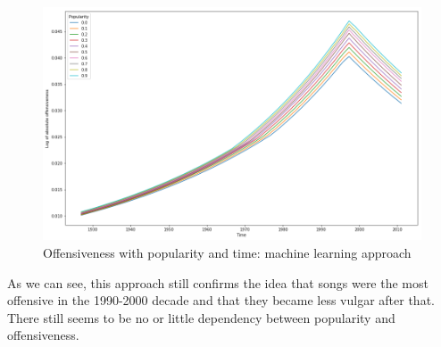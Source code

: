 \documentclass[11pt]{article}
\begin{document}
\begin{figure}
\centering
\includegraphics[width=\textwidth]{plots/ml_off_time_pop}
\caption{Offensiveness with popularity and time: machine learning approach}
\label{ml_off_time_pop}
\end{figure}

As we can see, this approach still confirms the idea that songs were the most offensive in the 1990-2000 decade and that they became less vulgar after that. There still seems to be no or little dependency between popularity and offensiveness.
\end{document}
